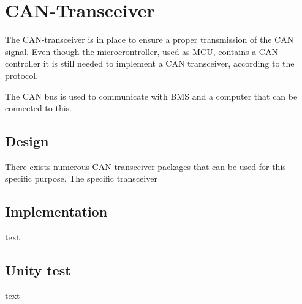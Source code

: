 \section{CAN-Transceiver}
The CAN-transceiver is in place to ensure a proper transmission of the CAN signal. Even though the microcrontroller, used as MCU, contains a CAN controller it is still needed to implement a CAN transceiver, according to the protocol.

The CAN bus is used to communicate with BMS and a computer that can be connected to this.   

\subsection{Design}
There exists numerous CAN transceiver packages that can be used for this specific purpose. The specific transceiver 

\subsection{Implementation}
text

\subsection{Unity test}
text